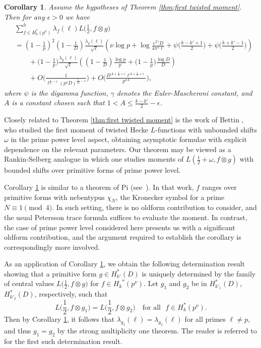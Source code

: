 \documentclass[12pt]{amsart}
\theoremstyle{plain}
\newtheorem{cor}[thm]{Corollary}
\theoremstyle{definition}
\begin{document}
\begin{cor}\label{cor:1st-moment}
Assume the hypotheses of Theorem \ref{thm:first twisted moment}.  Then for any $\epsilon>0$ we have
    \begin{align*}
    &\sum_{f\in H_k^*(p^\nu)}^h \lambda_f(\ell) L\Big(\frac12, f\otimes g \Big)
    \\&=
  \left(1-\frac1p\right)^2\left(1-\frac1D\right)\frac{\lambda_g(\ell)}{\sqrt{\ell}}
\left(\nu\log p+\log\frac{e^{2\gamma} D}{4\pi^2\ell}
+\psi\Big(\frac{k-k'+1}{2}\Big)
+\psi\Big(\frac{k+k'-1}{2}\Big)
\right)
\\&\hspace{2em}
+ \Big(1-\frac1p\Big)\frac{\lambda_g(\ell)}{\sqrt{\ell}}\left(\left(1-\frac1D\right)\frac{\log p}{p}
+\Big(1-\frac1p\Big)\frac{\log D}{D}\right) \\
&\hspace{2em}+O\bigg(\frac{ 1}{\ell^{\frac14-\epsilon}(p^\nu D)^{\frac{5}{32}-\epsilon}}\bigg)
  +O\bigg( \frac{D^{A+\frac12+\epsilon} \ell^{A+\frac12+\epsilon} }{p^{\nu A}}\bigg),
   \end{align*}
where $\psi$ is the digamma function, $\gamma$ denotes the Euler-Mascheroni constant, and $A$ is a constant chosen such that $1< A \leq \frac{k-k'}{2}-\epsilon$.
\end{cor}


Closely related to Theorem \ref{thm:first twisted moment} is the work of Bettin \cite{Bettin}, who studied the first moment of twisted Hecke $L$-functions with unbounded shifts $\omega$ in the prime power level aspect, obtaining asymptotic formulae with explicit dependence on the relevant parameters. Our theorem may be viewed as a Rankin-Selberg analogue in which one studies moments of $L(\frac12+\omega,f\otimes g)$ with bounded shifts over primitive forms of prime power level.




Corollary \ref{cor:1st-moment} is similar to a theorem of Pi (see~\cite[Theorem 1.1]{Pi}). In that work, $f$ ranges over primitive forms with nebentypus $\chi_N$, the Kronecker symbol for a prime $N \equiv 1 \pmod{4}$. In such setting, there is no oldform contribution to consider, and the usual Petersson trace formula suffices to evaluate the moment. In contrast, the case of prime power level considered here presents us with a significant oldform contribution, and the argument required to establish the corollary is correspondingly more involved.


As an application of Corollary \ref{cor:1st-moment}, we obtain the following determination result showing that a primitive form $g \in H^*_{k'}(D)$ is uniquely determined by the family of central values $ L\big(\frac12, f\otimes g \big)$ for $f\in {H_k}^*(p^\nu)$. Let $g_1$ and $g_2$ be in $H_{k'_1}^*(D)$, $H_{k'_2}^*(D)$, respectively, such that
\[
 L\Big(\frac12, f\otimes g_1 \Big) =  L\Big(\frac12, f\otimes g_2 \Big) \quad \text{for all }\,\, f\in H_k^*(p^\nu) .
\]
Then by Corollary \ref{cor:1st-moment}, it follows that $\lambda_{g_1}(\ell) = \lambda_{g_2}(\ell)$ for all primes $\ell\neq p$, and thus $g_1=g_2$ by the strong multiplicity one theorem. The reader is referred to \cite{Luo Rama} for the first such determination result.
\end{document}
